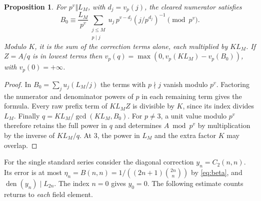 \documentclass[11pt]{article}
\newtheorem{proposition}[theorem]{Proposition}
\DeclareMathOperator{\den}{den}
\begin{document}
\begin{proposition}\label{prop:local}
For $p^v\Vert L_M$, with $d_j=v_p(j)$, the cleared numerator satisfies
\[
 B_0\equiv\frac{L_M}{p^v}
   \sum_{\substack{j\le M\\p\mid j}}
       u_j\,p^{v-d_j}(j/p^{d_j})^{-1}\pmod{p^v}.
\]
Modulo $K$, it is the sum of the correction terms alone, each multiplied
by $KL_M$. If $Z=A/q$ is in lowest terms then
$v_p(q)=\max(0,v_p(KL_M)-v_p(B_0))$, with $v_p(0)=+\infty$.
\end{proposition}
\begin{proof}
In $B_0=\sum_j u_j(L_M/j)$ the terms with $p\nmid j$ vanish modulo $p^v$.
Factoring the numerator and denominator powers of $p$ in each remaining term
gives the formula. Every raw prefix term of $KL_M Z$ is divisible by $K$,
since its index divides $L_M$. Finally $q=KL_M/\gcd(KL_M,B_0)$.
For $p\ne3$, a unit value modulo $p^v$ therefore retains the full power in $q$
and determines $A\bmod p^v$ by multiplication by the inverse of $KL_M/q$.
At $3$, the power in $L_M$ and the extra factor $K$ may overlap.
\end{proof}

For the single standard series consider the diagonal correction
$y_n=C_2(n,n)$. Its error is at most
$\eta_n=B(n,n)=1/((2n+1)\binom{2n}{n})$ by \eqref{eq:beta}, and
$\den(y_n)\mid L_{2n}$. The index $n=0$ gives $y_0=0$.
The following estimate counts returns to \emph{each} field element.
\end{document}

